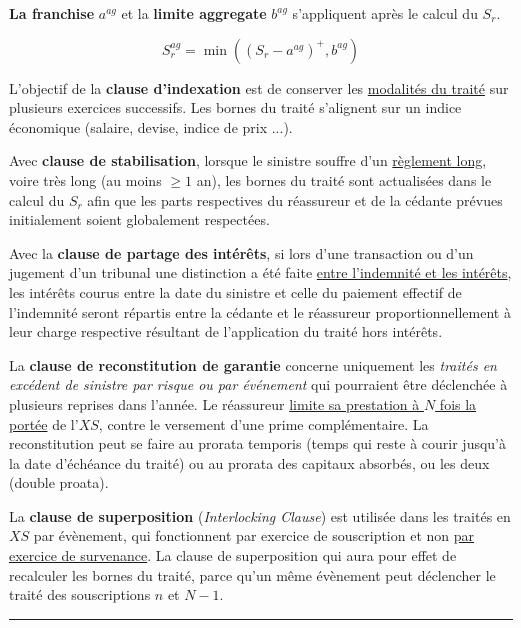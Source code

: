 \begin{f}

\textbf{La franchise} \(a^{ag}\) et la \textbf{limite aggregate}  \(b^{ag}\)  s'appliquent après le calcul du \(S_r\). 

\[
S_r^{ag} = \min\left( \left(S_r - a^{ag}  \right)^+,b^{ag}\right)  
\]
\medskip

L'objectif de la \textbf{clause d'indexation} est de conserver les \underline{modalités du traité} sur plusieurs exercices successifs.  Les bornes du traité s'alignent sur un indice économique (salaire, devise, indice de prix ...).
\medskip

Avec \textbf{clause de stabilisation}, lorsque le sinistre souffre d'un \underline{règlement long}, voire très long (au moins \(\geq 1\) an), les bornes du traité sont actualisées dans le calcul du \(S_r\) afin que les parts respectives du réassureur et de la cédante prévues initialement soient globalement respectées.
\medskip
	

Avec la \textbf{clause de partage des intérêts}, si lors d'une transaction ou d'un jugement d'un tribunal une distinction a été faite \underline{entre
		l'indemnité et les intérêts}, les intérêts courus entre la date du sinistre et celle du paiement effectif de l'indemnité seront répartis entre la cédante et le réassureur proportionnellement à
	leur charge respective résultant de l'application du traité hors intérêts.
\medskip


La \textbf{clause de reconstitution de garantie}
concerne uniquement les \emph{traités en excédent de sinistre par risque ou par événement} qui pourraient être déclenchée à plusieurs reprises dans l'année.
Le réassureur \underline{limite sa prestation à \(N \) fois la portée} de l'\(XS\), contre le versement d'une prime complémentaire. 
La reconstitution peut se faire au prorata temporis (temps qui reste à courir jusqu'à la date
d'échéance du traité) ou au prorata des capitaux absorbés, ou les deux (double proata). 

La \textbf{clause de superposition}
(\emph{Interlocking Clause})
 est utilisée dans les traités en \(XS\) par évènement,
qui fonctionnent par exercice de souscription et non \underline{par exercice de survenance}.
La clause de
superposition qui aura pour effet de recalculer les bornes du traité, parce qu'un même évènement peut déclencher le traité des souscriptions \(n\) et \(N-1\).
\end{f}
\hrule

